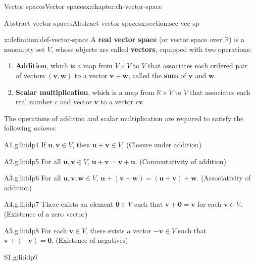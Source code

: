 \documentclass[oneside,10pt,]{book}
\newcommand{\terminology}[1]{\textbf{#1}}
\numberwithin{equation}{section}
\newcommand{\R}{\mathbb{R}}
\newcommand{\uu}{\mathbf{u}}
\newcommand{\vv}{\mathbf{v}}
\newcommand{\ww}{\mathbf{w}}
\newcommand{\zer}{\mathbf{0}}
\begin{document}
\begin{chapterptx}{Vector spaces}{}{Vector spaces}{}{}{x:chapter:ch-vector-space}
\begin{introduction}{}
\end{introduction}%
%
%
\typeout{************************************************}
\typeout{************************************************}
%
\begin{sectionptx}{Abstract vector spaces}{}{Abstract vector spaces}{}{}{x:section:sec-vec-sp}
\begin{definition}{}{x:definition:def-vector-space}%
A \terminology{real vector space} (or vector space over \(\R\)) is a nonempty set \(V\), whose objects are called \terminology{vectors}, equipped with two operations:%
\begin{enumerate}
\item{}\terminology{Addition}, which is a map from \(V\times V\) to \(V\) that associates each ordered pair of vectors \((\vv,\ww)\) to a vector \(\vv+\ww\), called the \terminology{sum} of \(\vv\) and \(\ww\).%
\item{}\terminology{Scalar multiplication}, which is a map from \(\R\times V\) to \(V\) that associates each real number \(c\) and vector \(\vv\) to a vector \(c\vv\).%
\end{enumerate}
%
\par
The operations of addition and scalar multiplication are required to satisfy the following \emph{axioms}:%
\begin{descriptionlist}
\begin{dlimedium}{A1.}{g:li:idp4}%
If \(\uu,\vv\in V\), then \(\uu+\vv\in V\). (Closure under addition)%
\end{dlimedium}%
\begin{dlimedium}{A2.}{g:li:idp5}%
For all \(\uu,\vv\in V\), \(\uu+\vv=\vv+\uu\). (Commutativity of addition)%
\end{dlimedium}%
\begin{dlimedium}{A3.}{g:li:idp6}%
For all \(\uu,\vv,\ww\in V\), \(\uu+(\vv+\ww)=(\uu+\vv)+\ww\). (Associativity of addition)%
\end{dlimedium}%
\begin{dlimedium}{A4.}{g:li:idp7}%
There exists an element \(\zer\in V\) such that \(\vv+\zer=\vv\) for each \(\vv\in V\). (Existence of a zero vector)%
\end{dlimedium}%
\begin{dlimedium}{A5.}{g:li:idp8}%
For each \(\vv\in V\), there exists a vector \(-\vv\in V\) such that \(\vv+(-\vv)=\zer\). (Existence of negatives)%
\end{dlimedium}%
\begin{dlimedium}{S1.}{g:li:idp9}%

\end{dlimedium}
\end{descriptionlist}
\end{definition}
\end{sectionptx}
\end{chapterptx}
\end{document}
